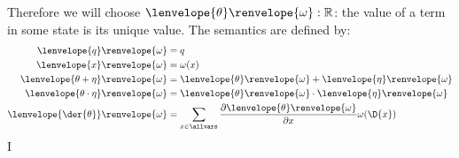 \documentclass[12pt]{cmuthesis}
\theoremstyle{definition}
\theoremstyle{remark}
\newcommand{\om}{\omega}
\newcommand{\CdGL}{\textsf{CdGL}\xspace}
\newcommand{\tint}[2]{\lenvelope{#1}\renvelope{#2}}
\newcommand{\fint}[1]{\lenvelope{#1}\renvelope}
\begin{document}
Therefore we will choose $\tint{\theta}{\om} : \mathbb{R}$: the value of a term in some state is its unique value.
The semantics are defined by:
\begin{align*}
  \tint{q}{\om} &= q\\
  \tint{x}{\om} &= \om(x)\\
  \tint{\theta + \eta}{\om} &= \tint{\theta}{\om} + \tint{\eta}{\om}\\
  \tint{\theta \cdot \eta}{\om} &= \tint{\theta}{\om} \cdot \tint{\eta}{\om}\\
  \tint{\der{\theta}}{\om} &= \sum_{x\in\allvars}\frac{\partial\tint{\theta}{\om}}{\partial x}\om(\D{x})
\end{align*}
I%
\end{document}

